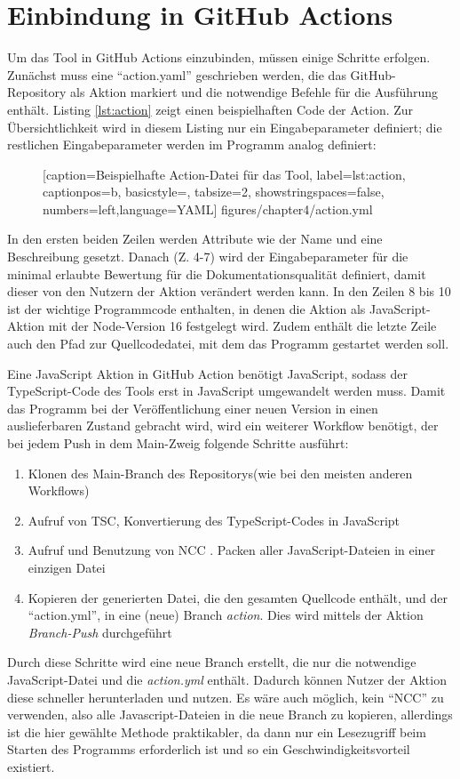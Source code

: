   
\section{Einbindung in GitHub Actions}\label{chapter:github_actions_impl}
Um das Tool in GitHub Actions einzubinden, müssen einige Schritte erfolgen. Zunächst muss eine \enquote{action.yaml} geschrieben werden, die das GitHub-Repository als Aktion markiert und die notwendige Befehle für die Ausführung enthält. Listing  \ref{lst:action} zeigt einen beispielhaften Code der Action. Zur Übersichtlichkeit wird in diesem Listing nur ein Eingabeparameter definiert; die restlichen Eingabeparameter werden im Programm analog definiert:
\begin{figure} [htbp]

[caption={Beispielhafte Action-Datei für das Tool},
label={lst:action},
captionpos=b, basicstyle=\footnotesize, tabsize=2, showstringspaces=false,  numbers=left,language=YAML]
{figures/chapter4/action.yml}
\end{figure}

In den ersten beiden Zeilen werden Attribute wie der Name und eine Beschreibung gesetzt. Danach (Z. 4-7) wird der Eingabeparameter für die minimal erlaubte Bewertung für die Dokumentationsqualität definiert, damit dieser von den Nutzern der Aktion verändert werden kann. In den Zeilen 8 bis 10 ist der wichtige Programmcode enthalten, in denen die Aktion als JavaScript-Aktion mit der Node-Version 16 festgelegt wird. Zudem enthält die letzte Zeile auch den Pfad zur Quellcodedatei, mit dem das Programm gestartet werden soll. 

\bigskip
Eine JavaScript Aktion in GitHub Action benötigt JavaScript, sodass der TypeScript-Code des Tools erst in JavaScript umgewandelt werden muss. Damit das Programm bei der Veröffentlichung einer neuen Version in einen auslieferbaren Zustand gebracht wird, wird ein weiterer Workflow benötigt, der bei jedem Push in dem Main-Zweig folgende Schritte ausführt:
\begin{enumerate}
    \item Klonen des Main-Branch des Repositorys(wie bei den meisten anderen Workflows)
    \item Aufruf von TSC, Konvertierung des TypeScript-Codes in JavaScript
    \item Aufruf und Benutzung von NCC       \cite{ncc}. Packen aller JavaScript-Dateien in einer einzigen Datei
    \item Kopieren der generierten Datei, die den gesamten Quellcode enthält, und der \enquote{action.yml}, in eine (neue) Branch \textit{action}. Dies wird mittels der Aktion \textit{Branch-Push} \cite{Branch-Push} durchgeführt
\end{enumerate}
Durch diese Schritte wird eine neue Branch erstellt, die nur die notwendige JavaScript-Datei und die \textit{action.yml} enthält. Dadurch können Nutzer der Aktion diese schneller herunterladen und nutzen. Es wäre auch möglich, kein \enquote{NCC} zu verwenden, also alle Javascript-Dateien in die neue Branch zu kopieren, allerdings ist die hier gewählte Methode praktikabler, da dann nur ein Lesezugriff beim Starten des Programms erforderlich ist und so ein Geschwindigkeitsvorteil existiert. 

